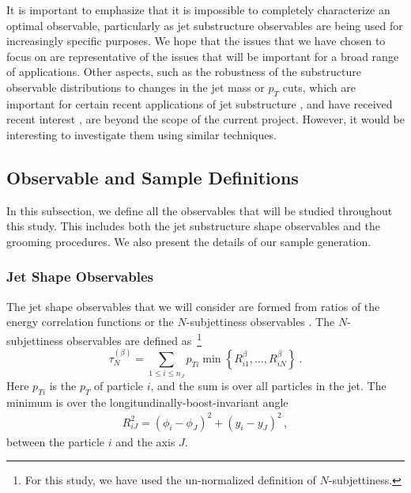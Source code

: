 It is important to emphasize that it is impossible to completely
characterize an optimal observable, particularly as jet substructure
observables are being used for increasingly specific
purposes.
%
We hope that the issues that we have chosen to focus on
are representative of the issues that will be important for a broad
range of applications.
%
Other aspects, such as the robustness of the substructure observable distributions to changes in the jet mass or $p_T$ cuts, which are important for certain recent applications of jet substructure \cite{Sirunyan:2017dgc,CMS-PAS-HIG-17-010,CMS-PAS-EXO-17-001,Sirunyan:2017dnz,Sirunyan:2017nvi,Aaboud:2018zba}, and have received recent interest \cite{Shimmin:2017mfk,Aguilar-Saavedra:2017rzt,Moult:2017okx}, are
beyond the scope of the current project.
However, it would be interesting to investigate them
using similar techniques.




\subsection{Observable and Sample Definitions}\label{sec:SM_jetsub_2prong:obs_def}

In this subsection, we define all the observables that will be studied throughout this study.
%
This includes both the jet substructure shape observables and the grooming procedures.  We also present the details of our sample generation.


\subsubsection{Jet Shape Observables}\label{sec:SM_jetsub_2prong:shape_def}

The jet shape observables that we will consider are formed from ratios of the energy correlation functions \cite{Larkoski:2013eya,Moult:2016cvt} or the $N$-subjettiness observables \cite{Thaler:2010tr,Thaler:2011gf}.
%
The $N$-subjettiness observables are defined as~\cite{Stewart:2010tn,Thaler:2010tr,Thaler:2011gf}\footnote{For this
  study, we have used the un-normalized definition of $N$-subjettiness.}
%
\begin{equation}\label{eq:SM_jetsub_2prong:nsubdef}
  \tau_{N}^{(\beta)} =
  \sum_{1\leq i \leq n_J} p_{Ti}\min\left\{
R_{i1}^\beta,\dotsc,R_{iN}^\beta
\right\} \ .
\end{equation}
%
Here $p_{Ti}$ is the $p_T$ of particle $i$, and the sum is over all
particles in the jet.
%
The minimum is over the longitundinally-boost-invariant angle
%
\begin{align}
R_{iJ}^2 = (\phi_i-\phi_J)^2+(y_i-y_J)^2\,,
\end{align}
%
between the particle $i$ and the axis $J$.


